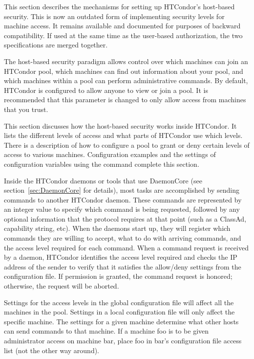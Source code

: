 This section describes the mechanisms for setting up HTCondor's
host-based security.
This is now an outdated form of implementing security
levels for machine access.
It remains available and documented for purposes of backward compatibility.
If used at the same time as the user-based authorization,
the two specifications are merged together.

The host-based security paradigm allows control over which machines can
join an HTCondor pool, which machines can find out information about
your pool, and which machines within a pool can perform
administrative commands.  By default, HTCondor is configured to allow
anyone to view or join a pool. It is recommended that this parameter is changed
to only allow access from machines that you trust.

This section discusses how the host-based security works inside HTCondor.
It lists the different levels of access and what
parts of HTCondor use which levels.
There is a description of how to configure
a pool to grant or deny certain levels of access to various
machines.
Configuration examples and the settings of configuration variables
using the  command complete this section.

Inside the HTCondor daemons or tools that use DaemonCore (see
section~\ref{sec:DaemonCore} for details), most
tasks are accomplished by sending commands to another HTCondor daemon.
These commands are represented by an integer value to specify which command
is being requested, followed
by any optional information that the protocol requires at that point
(such as a ClassAd, capability string, etc).
When the daemons start up,
they will register which commands they are willing to accept, what to
do with arriving commands, and the access level required for
each command.
When a command request is received by a daemon, HTCondor identifies the  access level
required and checks the IP address of the sender to verify that
it satisfies the allow/deny settings
from the configuration file.
If permission is granted, the command request is honored;
otherwise, the request will be aborted.

Settings for the access levels in the global
configuration file will affect all the machines in the pool.
Settings in a local configuration file will only affect the specific machine.
The settings for a given machine determine what other hosts can send
commands to that machine.
If a machine foo is to be given
administrator access on machine bar, place foo in
bar's configuration file access list (not the other way around).


